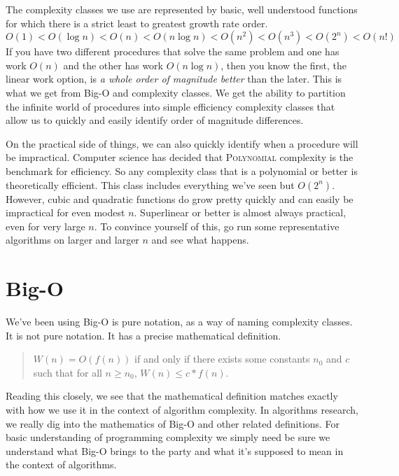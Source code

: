 \documentclass[]{tufte-handout}
\begin{document}
The complexity classes we use are represented by basic, well understood functions for which there is a strict least to greatest growth rate order.
\[
O(1) < O(\log n) < O(n) < O(n \log n) < O(n^2) < O(n^3) < O(2^n) < O(n!)
\]
If you have two different procedures that solve the same problem and one has work $O(n)$ and the other has work $O(n \log n)$, then you know the first, the linear work option, is \textit{a whole order of magnitude better} than the later. This is what we get from Big-O and complexity classes. We get the ability to partition the infinite world of procedures into simple efficiency complexity classes that allow us to quickly and easily identify order of magnitude differences.  

On the practical side of things, we can also quickly identify when a procedure will be impractical. Computer science has decided that \textsc{Polynomial} complexity is the benchmark for efficiency. So any complexity class that is a polynomial or better is theoretically efficient. This class includes everything we've seen but $O(2^n)$. However, cubic and quadratic functions do grow pretty quickly and can easily be impractical for even modest $n$.  Superlinear or better is almost always practical, even for very large $n$.  To convince yourself of this, go run some representative algorithms on larger and larger $n$ and see what happens.

\section{Big-O}

We've been using Big-O is pure notation, as a way of naming complexity classes. It is not pure notation. It has a precise mathematical definition. 
\begin{quote}
$W(n) = O(f(n))$ if and only if there exists some constants $n_0$ and $c$ such that for all $n \geq n_0$, $W(n) \leq c*f(n)$. 
\end{quote}

Reading this closely, we see that the mathematical definition matches exactly with how we use it in the context of algorithm complexity. In algorithms research, we really dig into the mathematics of Big-O and other related definitions.  For basic understanding of programming complexity we simply need be sure we understand what Big-O brings to the party and what it's supposed to mean in the context of algorithms.
\end{document}
